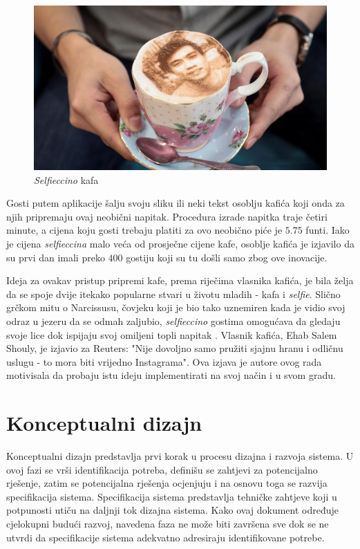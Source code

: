 \documentclass[12pt]{article}
\begin{document}
\begin{figure}[!h]
\centering
\includegraphics[scale=0.3]{slika_1}
\caption{\textit{Selfieccino} kafa}
\label{slika_1}
\end{figure}

Gosti putem aplikacije \v{s}alju svoju sliku ili neki tekst osoblju kafi\'ca koji onda za njih pripremaju ovaj neobi\v{c}ni napitak. Procedura izrade napitka traje \v{c}etiri minute, a cijena koju gosti trebaju platiti za ovo neobi\v{c}no pi\'ce je $5.75$ funti. Iako je cijena \textit{selfieccina} malo ve\'ca od prosje\v{c}ne cijene kafe, osoblje kafi\'ca je izjavilo da su prvi dan imali preko $400$ gostiju koji su tu do\v{s}li samo zbog ove inovacije.

Ideja za ovakav pristup pripremi kafe, prema rije\v{c}ima vlasnika kafi\'ca, je bila \v{z}elja da se spoje dvije itekako popularne stvari u \v{z}ivotu mladih - kafa i \textit{selfie}. Slično grčkom mitu o Narcissusu, čovjeku koji je bio tako uznemiren kada je vidio svoj odraz u jezeru da se odmah zaljubio, \textit{selfieccino} gostima omogućava da gledaju svoje lice dok ispijaju svoj omiljeni topli napitak \cite{bustle}. Vlasnik kafi\'ca, Ehab Salem Shouly, je izjavio za Reuters: "Nije dovoljno samo pružiti sjajnu hranu i odličnu uslugu - to mora biti vrijedno Instagrama". Ova izjava je autore ovog rada motivisala da probaju istu ideju implementirati na svoj na\v{c}in i u svom gradu. 

\newpage

\section{Konceptualni dizajn}

Konceptualni dizajn predstavlja prvi korak u procesu dizajna i razvoja sistema. U ovoj fazi se vrši identifikacija potreba, definišu se zahtjevi za potencijalno rješenje, zatim se potencijalna rješenja ocjenjuju i na osnovu toga se razvija specifikacija sistema. Specifikacija sistema predstavlja tehničke zahtjeve koji u potpunosti utiču na daljnji tok dizajna sistema. Kako ovaj dokument određuje cjelokupni budući razvoj, navedena faza ne može biti završena sve dok se ne utvrdi da specifikacije sistema adekvatno adresiraju identifikovane potrebe.
\end{document}
